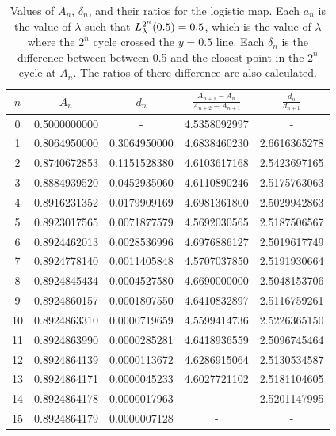\begin{table}
\centering
\begin{tabular}{|c|c|c|c|c|}
\hline
\( n \) & \( A_n \) & \( d_n \)  & \(\frac{A_{n+1} - A_n}{A_{n+2} - A_{n+1}}\)  &  \(\frac{d_n}{d_{n+1}}\) \\ \hline
0 & 0.5000000000 & - & 4.5358092997 & - \\
1 & 0.8064950000 & 0.3064950000 & 4.6838460230 & 2.6616365278 \\
2 & 0.8740672853 & 0.1151528380 & 4.6103617168 & 2.5423697165 \\
3 & 0.8884939520 & 0.0452935060 & 4.6110890246 & 2.5175763063 \\
4 & 0.8916231352 & 0.0179909169 & 4.6981361800 & 2.5029942863 \\
5 & 0.8923017565 & 0.0071877579 & 4.5692030565 & 2.5187506567 \\
6 & 0.8924462013 & 0.0028536996 & 4.6976886127 & 2.5019617749 \\
7 & 0.8924778140 & 0.0011405848 & 4.5707037850 & 2.5191930664 \\
8 & 0.8924845434 & 0.0004527580 & 4.6690000000 & 2.5048153706 \\
9 & 0.8924860157 & 0.0001807550 & 4.6410832897 & 2.5116759261 \\
10 & 0.8924863310 & 0.0000719659 & 4.5599414736 & 2.5226365150 \\
11 & 0.8924863990 & 0.0000285281 & 4.6418936559 & 2.5096745464 \\
12 & 0.8924864139 & 0.0000113672 & 4.6286915064 & 2.5130534587 \\
13 & 0.8924864171 & 0.0000045233 & 4.6027721102 & 2.5181104605 \\
14 & 0.8924864178 & 0.0000017963 &  - & 2.5201147995 \\
15 & 0.8924864179 & 0.0000007128 &  - &  - \\
\hline
\end{tabular}
\caption{
	Values of \( A_n \), \( \delta_n \), and their ratios for the logistic map.
	Each $a_n$ is the value of $\lambda$ such that $L_{\lambda}^{2^n}(0.5) = 0.5$, which is the value of $\lambda$ where the $2^n$ cycle crossed the $y=0.5$ line. 
	Each $\delta_n$ is the difference between between 0.5 and the closest point in the $2^n$ cycle at $A_n$.
	The ratios of there difference are also calculated.
}
\label{tab:feigenbuam_alpha_table_for_logistic}
\end{table}

